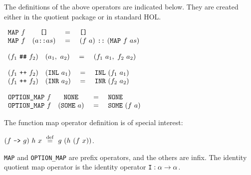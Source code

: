 \documentclass[envcountsame,runningheads]{llncs}
\def\defeq{\stackrel{\mathrm{def}}{=}}
\begin{document}
\noindent
The definitions of the above operators are indicated below.
They are created either in the quotient package or in standard HOL.

\begin{definition}
\label{listmap}
$\begin{array}[t]{lccl}
\mbox{\tt MAP}\ f & \mbox{\tt []} & \ = \  & \mbox{\tt []} \\
\mbox{\tt MAP}\ f & (a \mbox{\tt ::} as) & \ = \
   & (f\ a)\ \mbox{\tt ::}\ (\mbox{\tt MAP}\ f\ as)
\end{array}$
\end{definition}

\begin{definition}
\label{pairmap}
$\begin{array}[t]{lccl}
(f_1\ \mbox{\tt \#\#}\ f_2) & (a_1, \ a_2) & \ = \
   & (f_1\ a_1, \ f_2\ a_2)
\end{array}$
\end{definition}

\begin{definition}
\label{summap}
$\begin{array}[t]{lccl}
(f_1\ \mbox{\tt ++}\ f_2) & (\mbox{\tt INL}\ a_1) & \ = \
   & \mbox{\tt INL}\ (f_1\ a_1)  \\
(f_1\ \mbox{\tt ++}\ f_2) & (\mbox{\tt INR}\ a_2) & \ = \
   & \mbox{\tt INR}\ (f_2\ a_2)
\end{array}$
\end{definition}

\begin{definition}
\label{optionmap}
$\begin{array}[t]{lccl}
\mbox{\tt OPTION\_MAP}\ f & \mbox{\tt NONE} & \ = \
   & \mbox{\tt NONE}  \\
\mbox{\tt OPTION\_MAP}\ f & (\mbox{\tt SOME}\ a) & \ = \
   & \mbox{\tt SOME}\ (f\ a)
\end{array}$
\end{definition}

The
function map operator definition is of special interest:

\begin{definition}
\label{funmap}
$(f\ \mbox{\tt -->}\ g)\ h\ x \ \defeq \
g\ (h\ (f\ x))$.
\end{definition}

\noindent
{\tt MAP} and {\tt OPTION\_MAP} are prefix operators,
and the others are infix.
The identity quotient map operator is the identity operator
$\mbox{\tt I}:\alpha \rightarrow \alpha$.
\end{document}
